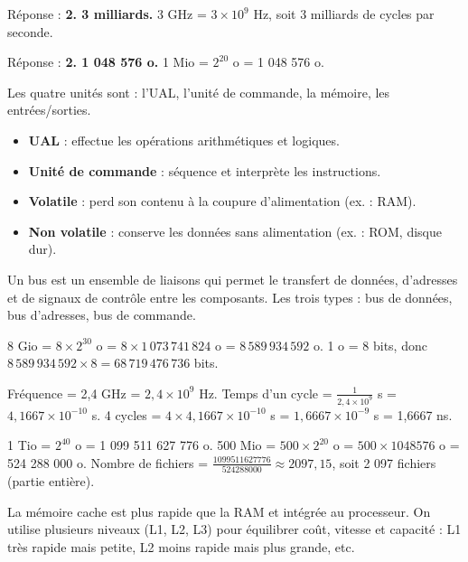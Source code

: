 Réponse : \textbf{2. 3 milliards.}
3 GHz = $3 \times 10^9$ Hz, soit 3 milliards de cycles par seconde.

Réponse : \textbf{2. 1 048 576 o.}
1 Mio = $2^{20}$ o = 1 048 576 o.

Les quatre unités sont : l’UAL, l’unité de commande, la mémoire, les entrées/sorties.

\begin{itemize}
    \item \textbf{UAL} : effectue les opérations arithmétiques et logiques.
    \item \textbf{Unité de commande} : séquence et interprète les instructions.
\end{itemize}

\begin{itemize}
    \item \textbf{Volatile} : perd son contenu à la coupure d’alimentation (ex. : RAM).
    \item \textbf{Non volatile} : conserve les données sans alimentation (ex. : ROM, disque dur).
\end{itemize}

Un bus est un ensemble de liaisons qui permet le transfert de données, d’adresses et de signaux de contrôle entre les composants. Les trois types : bus de données, bus d’adresses, bus de commande.

8 Gio = $8 \times 2^{30}$ o = $8 \times 1\,073\,741\,824$ o = $8\,589\,934\,592$ o.
1 o = 8 bits, donc $8\,589\,934\,592 \times 8 = 68\,719\,476\,736$ bits.

Fréquence = 2,4 GHz = $2,4 \times 10^9$ Hz.
Temps d’un cycle = $\frac{1}{2,4 \times 10^9}$ s = $4,1667 \times 10^{-10}$ s.
4 cycles = $4 \times 4,1667 \times 10^{-10}$ s = $1,6667 \times 10^{-9}$ s = 1,6667 ns.

1 Tio = $2^{40}$ o = 1 099 511 627 776 o.
500 Mio = $500 \times 2^{20}$ o = $500 \times 1 048 576$ o = 524 288 000 o.
Nombre de fichiers = $\frac{1 099 511 627 776}{524 288 000} \approx 2 097,15$, soit 2 097 fichiers (partie entière).

La mémoire cache est plus rapide que la RAM et intégrée au processeur. On utilise plusieurs niveaux (L1, L2, L3) pour équilibrer coût, vitesse et capacité : L1 très rapide mais petite, L2 moins rapide mais plus grande, etc.

